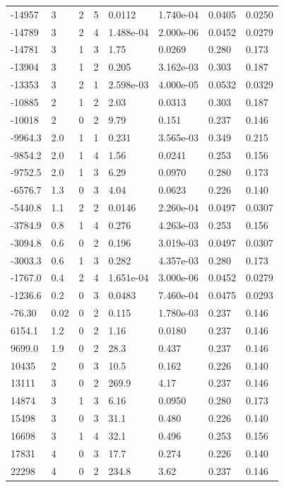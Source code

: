 \documentclass[preview]{standalone}
\begin{document}
{{\begin{tabular}{L{1.2cm}C{1.2cm} C{0.3cm}C{0.5cm} C{1.4cm}C{1.4cm} C{1.4cm}C{1.4cm}}
  -14957  &     3  & 2     &  5 &  0.0112  & 1.740e-04  & 0.0405 &  0.0250   \\ 
  -14789  &     3  & 2     &  4 &  1.488e-04  & 2.000e-06  & 0.0452 &  0.0279   \\ 
  -14781  &     3  & 1     &  3 &  1.75  & 0.0269  & 0.280 &  0.173   \\ 
  -13904  &     3  & 1     &  2 &  0.205  & 3.162e-03  & 0.303 &  0.187   \\ 
  -13353  &     3  & 2     &  1 &  2.598e-03  & 4.000e-05  & 0.0532 &  0.0329   \\ 
  -10885  &     2  & 1     &  2 &  2.03  & 0.0313  & 0.303 &  0.187   \\ 
  -10018  &     2  & 0     &  2 &  9.79  & 0.151  & 0.237 &  0.146   \\ 
  -9964.3  &   2.0  & 1     &  1 &  0.231  & 3.565e-03  & 0.349 &  0.215   \\ 
  -9854.2  &   2.0  & 1     &  4 &  1.56  & 0.0241  & 0.253 &  0.156   \\ 
  -9752.5  &   2.0  & 1     &  3 &  6.29  & 0.0970  & 0.280 &  0.173   \\ 
  -6576.7  &   1.3  & 0     &  3 &  4.04  & 0.0623  & 0.226 &  0.140   \\ 
  -5440.8  &   1.1  & 2     &  2 &  0.0146  & 2.260e-04  & 0.0497 &  0.0307   \\ 
  -3784.9  &   0.8  & 1     &  4 &  0.276  & 4.263e-03  & 0.253 &  0.156   \\ 
  -3094.8  &   0.6  & 0     &  2 &  0.196  & 3.019e-03  & 0.0497 &  0.0307   \\ 
  -3003.3  &   0.6  & 1     &  3 &  0.282  & 4.357e-03  & 0.280 &  0.173   \\ 
  -1767.0  &   0.4  & 2     &  4 &  1.651e-04  & 3.000e-06  & 0.0452 &  0.0279   \\ 
  -1236.6  &   0.2  & 0     &  3 &  0.0483  & 7.460e-04  & 0.0475 &  0.0293   \\ 
  -76.30  &  0.02  & 0     &  2 &  0.115  & 1.780e-03  & 0.237 &  0.146   \\ 
  6154.1  &   1.2  & 0     &  2 &  1.16  & 0.0180  & 0.237 &  0.146   \\ 
  9699.0  &   1.9  & 0     &  2 &  28.3  & 0.437  & 0.237 &  0.146   \\ 
  10435  &     2  & 0     &  3 &  10.5  & 0.162  & 0.226 &  0.140   \\ 
  13111  &     3  & 0     &  2 &  269.9  & 4.17  & 0.237 &  0.146   \\ 
  14874  &     3  & 1     &  3 &  6.16  & 0.0950  & 0.280 &  0.173   \\ 
  15498  &     3  & 0     &  3 &  31.1  & 0.480  & 0.226 &  0.140   \\ 
  16698  &     3  & 1     &  4 &  32.1  & 0.496  & 0.253 &  0.156   \\ 
  17831  &     4  & 0     &  3 &  17.7  & 0.274  & 0.226 &  0.140   \\ 
  22298  &     4  & 0     &  2 &  234.8  & 3.62  & 0.237 &  0.146   \\ 
\hline 
\end{tabular} 

}}
\end{document}
